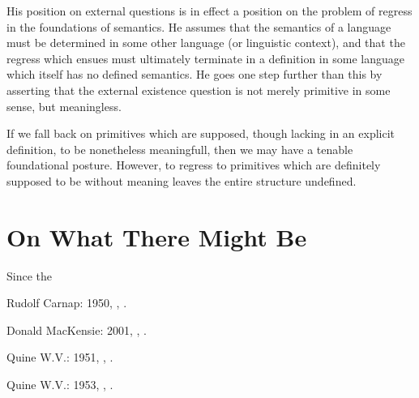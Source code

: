 \documentclass{rbjk}
\begin{document}
\begin{article}
His position on external questions is in effect a position on the problem of regress in the foundations of semantics.
He assumes that the semantics of a language must be determined in some other language (or linguistic context), and that the regress which ensues must ultimately terminate in a definition in some language which itself has no defined semantics.
He goes one step further than this by asserting that the external existence question is not merely primitive in some sense, but meaningless.

If we fall back on primitives which are supposed, though lacking in an explicit definition, to be nonetheless meaningfull, then we may have a tenable foundational posture.
However, to regress to primitives which are definitely supposed to be without meaning leaves the entire structure undefined.

\section{On What There Might Be}

Since the


\begin{thebibliography}{}

Rudolf Carnap: 1950,
,
.

Donald MacKensie: 2001,
,
.

Quine W.V.: 1951,
,
.

Quine W.V.: 1953,
,
.

\end{thebibliography}
\end{article}
\end{document}
